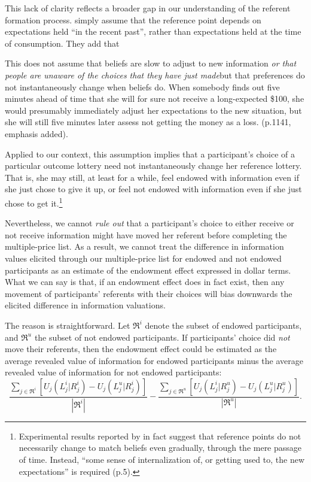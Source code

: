 \documentclass[12pt]{article}
\begin{document}
This lack of clarity reflects a broader gap in our understanding of the referent formation process. \citet{koszegiModelReferenceDependentPreferences2006} simply assume that the reference point depends on expectations held \enquote{in the recent past}, rather than expectations held at the time of consumption. They add that
\begin{displayquote}
  This does not assume that beliefs are slow to adjust to new information \emph{or that people are unaware of the choices that they have just made}\textemdash but that preferences do not instantaneously change when beliefs do. When somebody finds out five minutes ahead of time that she will for sure not receive a long-expected \$100, she would presumably immediately adjust her expectations to the new situation, but she will still five minutes later assess not getting the money as a loss. (p.1141, emphasis added).
\end{displayquote}

Applied to our context, this assumption implies that a participant’s choice of a particular outcome lottery need not instantaneously change her reference lottery. That is, she may still, at least for a while, feel endowed with information even if she just chose to give it up, or feel not endowed with information even if she just chose to get it.\footnote{Experimental results reported by \citet{heffetzAreReferencePoints2018} in fact suggest that reference points do not necessarily change to match beliefs even gradually, through the mere passage of time.  Instead, \enquote{some sense of internalization of, or getting used to, the new expectations} is required (p.5).}

Nevertheless, we cannot \emph{rule out} that a participant's choice to either receive or not receive information might have moved her referent before completing the multiple-price list. As a result, we cannot treat the difference in information values elicited through our multiple-price list for endowed and not endowed participants as an estimate of the endowment effect expressed in dollar terms. What we can say is that, if an endowment effect does in fact exist, then any movement of participants' referents with their choices will bias downwards the elicited difference in information valuations.

The reason is straightforward. Let $\Re^i$ denote the subset of endowed participants, and $\Re^u$ the subset of not endowed participants. If participants' choice did \emph{not} move their referents, then the endowment effect could be estimated as the average revealed value of information for endowed participants minus the average revealed value of information for not endowed participants:
\begin{equation*}
  \frac{\sum_{j \in \Re^i}[U_j(L_j^i|R_j^i)-U_j(L_j^u|R_j^i)]}
       {|\Re^i|}
  -
  \frac{\sum_{j \in \Re^u}[U_j(L_j^i|R_j^u)-U_j(L_j^u|R_j^u)]}
      {|\Re^u|}.
\end{equation*}
\end{document}
